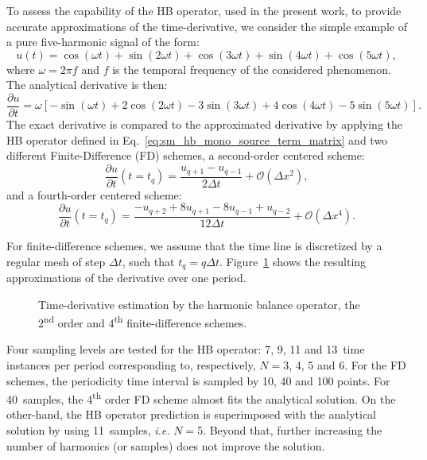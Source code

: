 To assess the capability of the HB operator, used in the present work, to
provide accurate approximations of the time-derivative, 
we consider the simple example of a pure
five-harmonic signal of the form:
\begin{equation}
    \label{eq:sum_sin}
    u(t) = \cos(\omega t) + \sin(2 \omega t) +
    \cos(3 \omega t) + \sin(4 \omega t) + \cos(5 \omega t),
\end{equation}
where $\omega = 2 \pi f$ and $f$ is the temporal frequency of
the considered phenomenon.
The analytical derivative is then:
\begin{equation}
    \label{eq:sum_sin_deriv}
    \frac{\partial u}{\partial t} = 
    \omega\left[ -\sin(\omega t) + 
    2\cos(2 \omega t) -
    3\sin(3 \omega t) + 
    4\cos(4 \omega t) -
    5\sin(5 \omega t)\right].
\end{equation}
The exact derivative is compared to the approximated derivative by applying 
the HB operator defined in Eq.~\eqref{eq:sm_hb_mono_source_term_matrix}
and two different Finite-Difference (FD) schemes,
a second-order centered scheme:
\begin{equation}
    \frac{\partial u}{\partial t} (t=t_q) =
    \frac{u_{q+1} - u_{q-1}}{2 \Delta t} + \mathcal{O} (\Delta x^2),
    \label{eq:hb_op_center2}
\end{equation}
and a fourth-order centered scheme:
\begin{equation}
    \frac{\partial u}{\partial t} (t=t_q) =
    \frac{-u_{q+2} + 8 u_{q+1} - 8 u_{q-1} + u_{q-2}}{12\Delta t}
    + \mathcal{O} (\Delta x^4).
    \label{eq:hb_op_center4}
\end{equation}

For finite-difference schemes, 
we assume that the time line is discretized 
by a regular mesh of step $\Delta t$, such that $t_q = q \Delta t$.
Figure~\ref{fig:hb_operator_sample} shows the resulting approximations 
of the derivative over one period.
\begin{figure}[htp]
  \centering
  \caption{Time-derivative estimation by the harmonic balance operator,
  the 2\textsuperscript{nd} order and 4\textsuperscript{th} finite-difference schemes.}
  \label{fig:hb_operator_sample}
\end{figure}
Four sampling levels
are tested for the HB operator: 7, 9, 11 and 13~time instances per period
corresponding to, respectively, $N=3$, 4, 5 and 6.
For the FD schemes, the periodicity time interval is sampled by
10, 40 and 100 points.
For 40~samples, the 4\textsuperscript{th} order FD
scheme almost fits the analytical solution. On the other-hand,
the HB operator prediction is superimposed with the analytical solution
by using 11~samples, \emph{i.e.} $N=5$. Beyond that, further increasing the
number of harmonics (or samples)
does not improve the solution.

